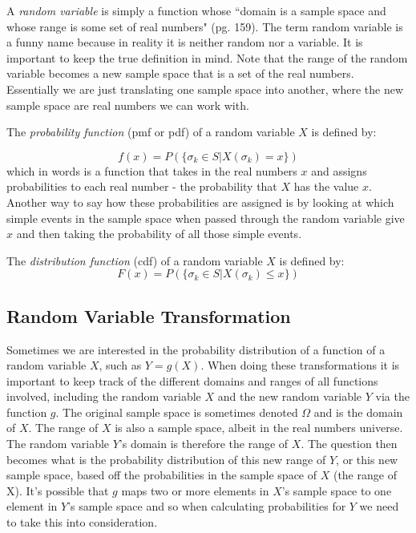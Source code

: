 A \emph{random variable} is simply a function whose ``domain is a sample space and whose range is some set of real numbers" (pg. 159). The term random variable is a funny name because in reality it is neither random nor a variable. It is important to keep the true definition in mind. Note that the range of the random variable becomes a new sample space that is a set of the real numbers. Essentially we are just translating one sample space into another, where the new sample space are real numbers we can work with. 

The \emph{probability function} (pmf or pdf) of a random variable $X$ is defined by:

\begin{equation}
f(x) = P(\{\sigma_k \in S | X(\sigma_k) = x\})
\end{equation}
\noindent which in words is a function that takes in the real numbers $x$ and assigns probabilities to each real number - the probability that $X$ has the value $x$. Another way to say how these probabilities are assigned is by looking at which simple events in the sample space when passed through the random variable give $x$ and then taking the probability of all those simple events.

The \emph{distribution function} (cdf) of a random variable $X$ is defined by:
\begin{equation}
F(x) = P(\{\sigma_k \in S | X(\sigma_k) \leq x\})
\end{equation}


\subsection{Random Variable Transformation}

Sometimes we are interested in the probability distribution of a function of a random variable $X$, such as $Y=g(X)$. When doing these transformations it is important to keep track of the different domains and ranges of all functions involved, including the random variable $X$ and the new random variable $Y$ via the function $g$. The original sample space is sometimes denoted $\Omega$ and is the domain of $X$. The range of $X$ is also a sample space, albeit in the real numbers universe. The random variable $Y$'s domain is therefore the range of $X$. The question then becomes what is the probability distribution of this new range of $Y$, or this new sample space, based off the probabilities in the sample space of $X$ (the range of X). It's possible that $g$ maps two or more elements in $X$'s sample space to one element in $Y$'s sample space and so when calculating probabilities for $Y$ we need to take this into consideration. 

